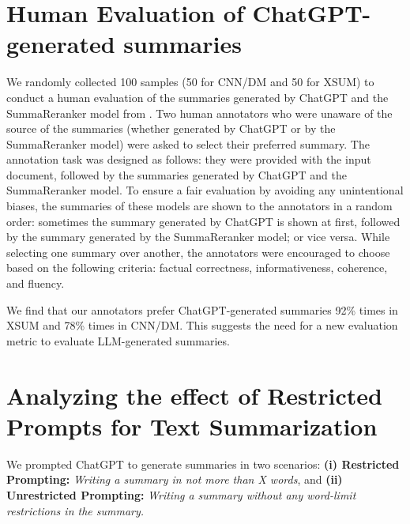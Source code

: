 \documentclass[11pt]{article}
\begin{document}
\section{Human Evaluation of ChatGPT-generated summaries}
\label{appendix:human_eval_summary}

We randomly collected 100 samples (50 for CNN/DM and 50 for XSUM) to conduct a human evaluation of the summaries generated by ChatGPT and the SummaReranker model from \citet{ravaut2022summareranker}. Two human annotators who were unaware of the source of the summaries (whether generated by ChatGPT or by the SummaReranker model) were asked to 
select their preferred summary. The annotation task was designed as follows: they were provided with the input document, followed by the summaries generated by ChatGPT and the SummaReranker model. To ensure a fair evaluation by avoiding any unintentional biases, the summaries of these models are shown to the annotators in a random order: sometimes the summary generated by ChatGPT is shown at first, followed by the summary generated by the SummaReranker model; or vice versa. While selecting one summary over another, the annotators were encouraged to choose based on the following criteria: factual correctness, informativeness, coherence, and fluency. 

We find that our annotators prefer ChatGPT-generated summaries 92\% times in XSUM and 78\% times in CNN/DM. This suggests the need for a new evaluation metric to evaluate LLM-generated summaries. 

\section{Analyzing the effect of Restricted Prompts for Text Summarization}
\label{appendix:summarization_restriction_effect}
We prompted ChatGPT to generate summaries in two scenarios: \textbf{(i) Restricted Prompting:} \textit{Writing a summary in not more than X words}, and  \textbf{(ii) Unrestricted Prompting:} \textit{Writing a summary without any word-limit restrictions in the summary.} 
\end{document}
